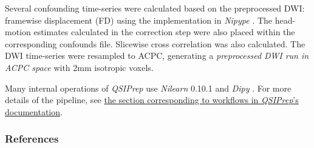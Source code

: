 \documentclass[
]{article}
\begin{document}
Several confounding time-series were calculated based on the
preprocessed DWI: framewise displacement (FD) using the implementation
in \emph{Nipype} \citep[following the definitions by][]{power_fd_dvars}.
The head-motion estimates calculated in the correction step were also
placed within the corresponding confounds file. Slicewise cross
correlation was also calculated. The DWI time-series were resampled to
ACPC, generating a \emph{preprocessed DWI run in ACPC space} with 2mm
isotropic voxels.

Many internal operations of \emph{QSIPrep} use \emph{Nilearn} 0.10.1
\citep[RRID:SCR\_001362]{nilearn} and \emph{Dipy} \citep{dipy}. For more
details of the pipeline, see
\href{https://qsiprep.readthedocs.io/en/latest/workflows.html}{the
section corresponding to workflows in \emph{QSIPrep}'s documentation}.

\subsubsection{References}\label{references}


\end{document}
